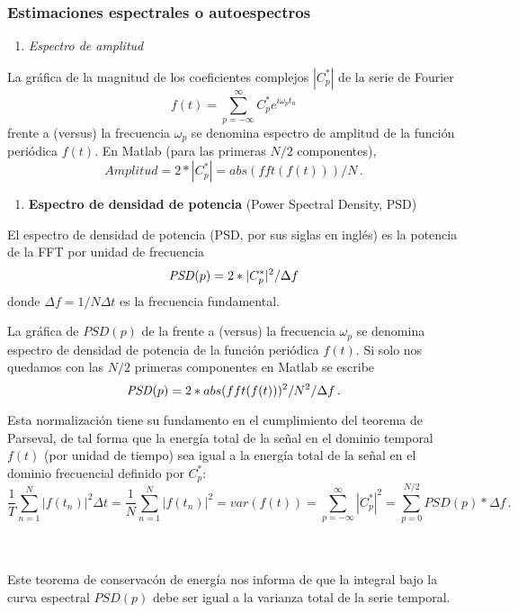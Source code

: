 \documentclass[
]{agujournal2019}
\providecommand{\tightlist}{%
  \setlength{\itemsep}{0pt}\setlength{\parskip}{0pt}}\usepackage{longtable,booktabs,array}
\begin{document}
\vspace{0.25cm}

\subsubsection{Estimaciones espectrales o
autoespectros}\label{estimaciones-espectrales-o-autoespectros}

\vspace{0.5cm}

\begin{enumerate}
\def\labelenumi{(\arabic{enumi})}
\tightlist
\item
  \emph{Espectro de amplitud}
\end{enumerate}

La gráfica de la magnitud de los coeficientes complejos \(|C_p^*|\) de
la serie de Fourier
\[f(t)=\sum\limits^\infty_{p=-\infty} C^*_p e^{i\omega_p t_n}\] frente a
(versus) la frecuencia \(\omega_p\) se denomina espectro de amplitud de
la función periódica \(f(t)\). En Matlab (para las primeras \(N/2\)
componentes), \[{ Amplitud}=2*|C^*_p|=abs({ fft}(f(t)))/N\,.\]

\vspace{0.5cm}

\begin{enumerate}
\def\labelenumi{(\arabic{enumi})}
\setcounter{enumi}{1}
\tightlist
\item
  \textbf{Espectro de densidad de potencia} (Power Spectral Density,
  PSD)
\end{enumerate}

El espectro de densidad de potencia (PSD, por sus siglas en inglés) es
la potencia de la FFT por unidad de frecuencia
\[{\it PSD}(p)=2*|C^*_p|^2/\Delta f\] donde \(\Delta f=1/N\Delta t\) es
la frecuencia fundamental.

La gráfica de \({ PSD}(p)\) de la frente a (versus) la frecuencia
\(\omega_p\) se denomina espectro de densidad de potencia de la función
periódica \(f(t)\). Si solo nos quedamos con las \(N/2\) primeras
componentes en Matlab se escribe
\[{\it PSD}(p)=2*abs({ fft}(f(t)))^2/N^2/\Delta f\,.\]

Esta normalización tiene su fundamento en el cumplimiento del teorema de
Parseval, de tal forma que la energía total de la señal en el dominio
temporal \(f(t)\) (por unidad de tiempo) sea igual a la energía total de
la señal en el dominio frecuencial definido por \(C^*_p\):
\[\frac{1}{T}\sum\limits^N_{n=1}|f(t_n)|^2 \Delta t =\frac{1}{N}\sum\limits^N_{n=1}|f(t_n)|^2 =
var(f(t))=\sum\limits^{\infty}_{p=-\infty} |C^*_p|^2=\sum\limits^{N/2}_{p=0}PSD(p)*\Delta f\,.\]\\
\strut \\
Este teorema de conservacón de energía nos informa de que la integral
bajo la curva espectral \({ PSD}(p)\) debe ser igual a la varianza total
de la serie temporal.
\end{document}
